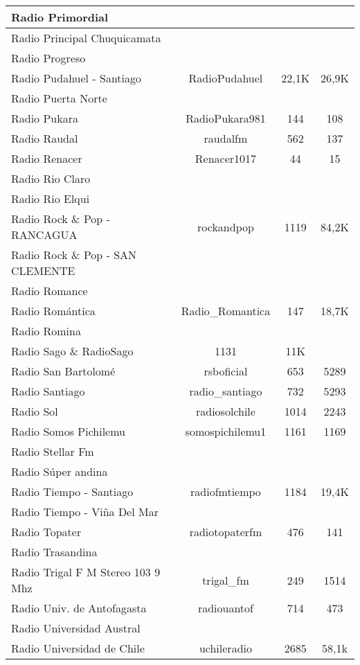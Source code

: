 \begin{center}
\begin{longtable}{| l | c | c | c |}
Radio Primordial	&		&		&		\\ \hline
Radio Principal Chuquicamata	&		&		&		\\ \hline
Radio Progreso	&		&		&		\\ \hline
Radio Pudahuel - Santiago	&	RadioPudahuel	&	22,1K	&	26,9K	\\ \hline
Radio Puerta Norte	&		&		&		\\ \hline
Radio Pukara	&	RadioPukara981	&	144	&	108	\\ \hline
Radio Raudal	&	raudalfm	&	562	&	137	\\ \hline
Radio Renacer	&	Renacer1017	&	44	&	15	\\ \hline
Radio Rio Claro	&		&		&		\\ \hline
Radio Rio Elqui	&		&		&		\\ \hline
Radio Rock \& Pop - RANCAGUA	&	rockandpop	&	1119	&	84,2K	\\ \hline
Radio Rock \& Pop - SAN CLEMENTE	&		&		&		\\ \hline
Radio Romance	&		&		&		\\ \hline
Radio Romántica	&	Radio\_Romantica	&	147	&	18,7K	\\ \hline
Radio Romina	&		&		&		\\ \hline
Radio Sago	\&	RadioSago	&	1131	&	11K	\\ \hline
Radio San Bartolomé	&	rsboficial	&	653	&	5289	\\ \hline
Radio Santiago	&	radio\_santiago	&	732	&	5293	\\ \hline
Radio Sol	&	radiosolchile	&	1014	&	2243	\\ \hline
Radio Somos Pichilemu	&	somospichilemu1	&	1161	&	1169	\\ \hline
Radio Stellar Fm	&		&		&		\\ \hline
Radio Súper andina	&		&		&		\\ \hline
Radio Tiempo - Santiago	&	radiofmtiempo	&	1184	&	19,4K	\\ \hline
Radio Tiempo - Viña Del Mar	&		&		&		\\ \hline
Radio Topater	&	radiotopaterfm	&	476	&	141	\\ \hline
Radio Trasandina	&		&		&		\\ \hline
Radio Trigal F M Stereo 103 9 Mhz	&	trigal\_fm	&	249	&	1514	\\ \hline
Radio Univ. de Antofagasta	&	radiouantof	&	714	&	473	\\ \hline
Radio Universidad Austral	&		&		&		\\ \hline
Radio Universidad de Chile	&	uchileradio	&	2685	&	58,1k	\\ \hline

\end{longtable}
\end{center}
